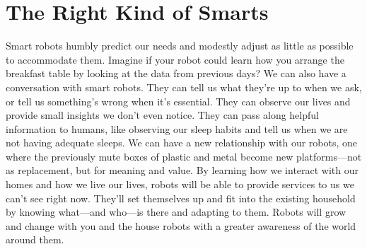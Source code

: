 \documentclass[11pt]{book}
\begin{document}
\section{ The Right Kind of Smarts }
Smart robots humbly predict our needs and modestly adjust as little as possible to accommodate them. Imagine if your robot could learn how you arrange the breakfast table by looking at the data from previous days? 
We can also have a conversation with smart robots. They can tell us what they’re up to when we ask, or tell us something’s wrong when it’s essential. They can observe our lives and provide small insights we don’t even notice. They can pass along helpful information to humans, like observing our sleep habits and tell us when we are not having adequate sleeps.
We can have a new relationship with our robots, one where the previously mute boxes of plastic and metal become new platforms—not as replacement, but for meaning and value. By learning how we interact with our homes and how we live our lives, robots will be able to provide services to us we can’t see right now. They’ll set themselves up and fit into the existing household by knowing what—and who—is there and adapting to them. Robots will grow and change with you and the house robots with a greater awareness of the world around them.
\end{document}

